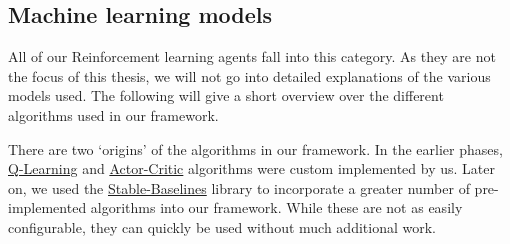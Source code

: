\subsection*{Machine learning models}

All of our Reinforcement learning agents fall into this category. As they are not the focus of this thesis, we will not go into detailed explanations of the various models used. The following will give a short overview over the different algorithms used in our framework.

There are two `origins' of the algorithms in our framework. In the earlier phases, \hyperref[item:QLearning]{Q-Learning} and \hyperref[item:ActorCritic]{Actor-Critic} algorithms were custom implemented by us. Later on, we used the \hyperref[item:StableBaselines]{Stable-Baselines} library to incorporate a greater number of pre-implemented algorithms into our framework. While these are not as easily configurable, they can quickly be used without much additional work.

